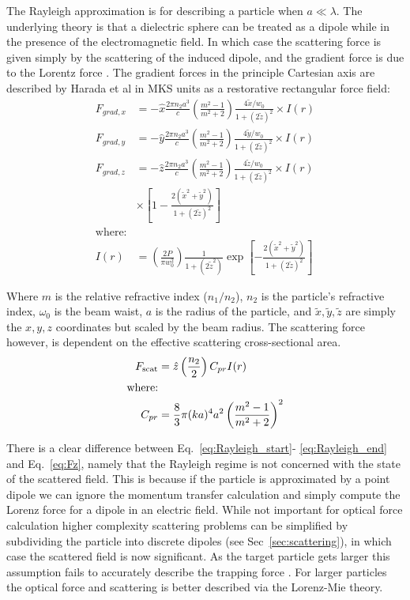The Rayleigh approximation is for describing a particle when 
$a \ll \lambda$. The underlying theory is that a dielectric sphere 
can be treated as a dipole while in the presence of the 
electromagnetic field. In which case the scattering force is 
given simply by the scattering of the induced dipole, and the 
gradient force is due to the Lorentz force \cite{Gordon1973}. 
The gradient forces in the principle Cartesian axis are 
described by Harada et al \cite{YasuhiroHarada1996} in MKS units 
as a restorative rectangular force field:
\begin{align}
  F_{grad,x}
  &=-\hat{x} \frac{2\pi n_2 a^3}{c}
    \left(\frac{m^2-1}{m^2+2}\right) \frac{4\tilde{x}/w_0}{1+(2\tilde{z})^2} \times I(r)
  \label{eq:Rayleigh_start}\\
  F_{grad,y}
  &=-\hat{y} \frac{2\pi n_2 a^3}{c}
    \left(\frac{m^2-1}{m^2+2}\right) \frac{4\tilde{y}/w_0}{1+(2\tilde{z})^2} \times I(r)
  \\
  F_{grad,z}
  &=-\hat{z} \frac{2\pi n_2 a^3}{c}
    \left(\frac{m^2-1}{m^2+2}\right) \frac{4\tilde{z}/w_0}{1+(2\tilde{z})^2}
    \nonumber \times I(r)
  \\ 
  & \times \left[1-\frac{2(\tilde{x}^2+\tilde{y}^2)}{1+(2\tilde{z})^2} \right]
  \\
  \label{eq:Rayleigh_end}
  \text{where:}
  \nonumber
  \\
	I(r) &= \left(\frac{2P}{\pi w_0^2}\right) \frac{1}{1+(2\tilde{z}^2)} 
	\exp \left[ - \frac{2(\tilde{x}^2+\tilde{y}^2)}{1+(2\tilde{z})^2} \right]
\end{align}

\noindent
Where $m$ is the relative refractive index ($n_1/n_2$), $n_2$ is 
the particle's refractive index, $\omega_0$ is the beam waist, 
$a$ is the radius of the particle, and $\tilde{x}, \tilde{y}, 
\tilde{z}$ are simply the $x, y, z$ coordinates but scaled by the 
beam radius. The scattering force however, is dependent on the 
effective scattering cross-sectional area. 
\begin{align}
  F_{\rm scat}
  &= \hat{z} \left(\frac{n_2}{2}\right) C_{pr} I(r) \\
  \text{where:} \nonumber \\
  C_{pr} &= \frac{8}{3} \pi (ka)^4 a^2 \left(\frac{m^2-1}{m^2+2}\right)^2
\end{align}

There is a clear difference between Eq.~\eqref{eq:Rayleigh_start}-
\eqref{eq:Rayleigh_end} and Eq.~\eqref{eq:Fz}, namely that the 
Rayleigh regime is not concerned with the state of the scattered
field. This is because if the particle is approximated by a point
dipole we can ignore the momentum transfer calculation and simply
compute the Lorenz force for a dipole in an electric field. While 
not important for optical force calculation higher complexity 
scattering problems can be simplified by subdividing the particle 
into discrete dipoles (see Sec~\ref{sec:scattering}), in which case 
the scattered field is now significant. As the target particle gets 
larger this assumption fails to accurately describe the trapping force 
\cite{Li2021}. For larger particles the optical force and scattering 
is better described via the Lorenz-Mie theory. 

